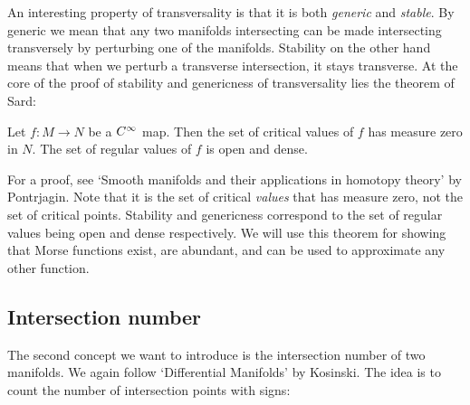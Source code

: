 An interesting property of transversality is that it is both \emph{generic} and \emph{stable}.
By generic we mean that any two manifolds intersecting can be made intersecting transversely by perturbing one of the manifolds.
Stability on the other hand means that when we perturb a transverse intersection, it stays transverse.
At the core of the proof of stability and genericness of transversality lies the theorem of Sard:
\begin{theorem}
    Let $f: M \to  N$ be a $C^\infty$ map. Then the set of critical values of  $f$ has measure zero in $N$.
    The set of regular values of $f$ is open and dense.
\end{theorem}
For a proof, see `Smooth manifolds and their applications in homotopy theory' by Pontrjagin.
Note that it is the set of critical \emph{values} that has measure zero, not the set of critical points. 
Stability and genericness correspond to the set of regular values being open and dense respectively.
We will use this theorem for showing that Morse functions exist, are abundant, and can be used to approximate any other function.

\filbreak
\subsection*{Intersection number}

The second concept we want to introduce is the intersection number of two manifolds.
We again follow `Differential Manifolds' by Kosinski.
The idea is to count the number of intersection points with signs:

